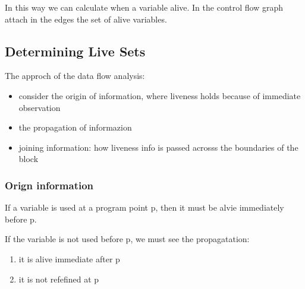 In this way we can calculate when a variable alive. In the control flow graph
attach in the edges the set of alive variables.

\subsection{Determining Live Sets}
The approch of the data flow analysis:
\begin{itemize}
\item consider the origin of information, where liveness holds because of immediate
observation
\item the propagation of informazion
\item joining information: how liveness info is passed acrosss the boundaries
of the block
\end{itemize}

\subsubsection{Orign information}
If a variable is used at a program point p, then it must be alvie immediately
before p.

If the variable is not used before p, we must see the propagatation:
\begin{enumerate}
\item it is alive immediate after p
\item it is not refefined at p
\end{enumerate}

